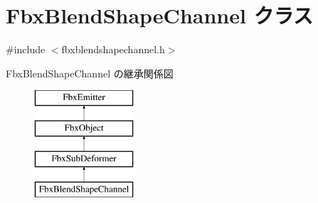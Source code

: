 \hypertarget{class_fbx_blend_shape_channel}{}\section{Fbx\+Blend\+Shape\+Channel クラス}
\label{class_fbx_blend_shape_channel}


{\ttfamily \#include $<$fbxblendshapechannel.\+h$>$}

Fbx\+Blend\+Shape\+Channel の継承関係図\begin{figure}[H]
\begin{center}
\leavevmode
\includegraphics[height=4.000000cm]{class_fbx_blend_shape_channel}
\end{center}
\end{figure}

